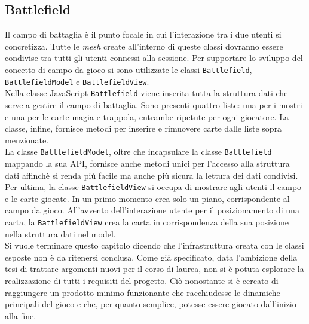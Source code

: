 \subsection{Battlefield}\label{subsec:battlefield}
Il campo di battaglia è il punto focale in cui l'interazione tra i due utenti si concretizza. Tutte le \textit{mesh} create all'interno di queste classi dovranno essere condivise
tra tutti gli utenti connessi alla sessione. Per supportare lo sviluppo del concetto di campo da gioco si sono utilizzate le classi \texttt{Battlefield}, \texttt{BattlefieldModel} e
\texttt{BattlefieldView}.\\
Nella classe JavaScript \texttt{Battlefield} viene inserita tutta la struttura dati che serve a gestire il campo di battaglia. Sono presenti quattro liste: una per i mostri e una per
le carte magia e trappola, entrambe ripetute per ogni giocatore. La classe, infine, fornisce metodi per inserire e rimuovere carte dalle liste sopra menzionate.\\
La classe \texttt{BattlefieldModel}, oltre che incapsulare la classe \texttt{Battlefield} mappando la sua API, fornisce anche metodi unici per l'accesso alla struttura dati affinchè
si renda più facile ma anche più sicura la lettura dei dati condivisi.\\
Per ultima, la classe \texttt{BattlefieldView} si occupa di mostrare agli utenti il campo e le carte giocate. In un primo momento crea solo un piano, corrispondente al campo da gioco. 
All'avvento dell'interazione utente per il posizionamento di una carta, la \texttt{BattlefieldView} crea la carta in corrispondenza della sua posizione nella struttura
dati nel model.\\
\newline
Si vuole terminare questo capitolo dicendo che l'infrastruttura creata con le classi esposte non è da ritenersi conclusa. Come già specificato, data l'ambizione della tesi di 
trattare argomenti nuovi per il corso di laurea, non si è potuta esplorare la realizzazione di tutti i requisiti del progetto. Ciò nonostante si è cercato di raggiungere un 
prodotto minimo funzionante che racchiudesse le dinamiche principali del gioco e che, per quanto semplice, potesse essere giocato dall'inizio alla fine.
